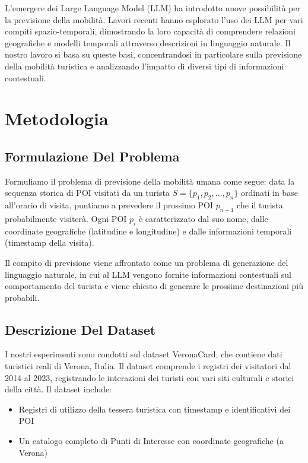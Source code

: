 \documentclass[12pt,a4paper]{article}
\begin{document}
L'emergere dei Large Language Model (LLM) ha introdotto nuove possibilità per la previsione della mobilità. Lavori recenti hanno esplorato l'uso dei LLM per vari compiti spazio-temporali, dimostrando la loro capacità di comprendere relazioni geografiche e modelli temporali attraverso descrizioni in linguaggio naturale. Il nostro lavoro si basa su queste basi, concentrandosi in particolare sulla previsione della mobilità turistica e analizzando l'impatto di diversi tipi di informazioni contestuali.

\newpage

\section{Metodologia}

\subsection{Formulazione Del Problema}

Formuliamo il problema di previsione della mobilità umana come segue: data la sequenza storica di POI visitati da un turista $S = \{p_1, p_2, ..., p_n\}$ ordinati in base all'orario di visita, puntiamo a prevedere il prossimo POI $p_{n+1}$ che il turista probabilmente visiterà. Ogni POI $p_i$ è caratterizzato dal suo nome, dalle coordinate geografiche (latitudine e longitudine) e dalle informazioni temporali (timestamp della visita).

Il compito di previsione viene affrontato come un problema di generazione del linguaggio naturale, in cui al LLM vengono fornite informazioni contestuali sul comportamento del turista e viene chiesto di generare le prossime destinazioni più probabili.


\subsection{Descrizione Del Dataset}

I nostri esperimenti sono condotti sul dataset VeronaCard, che contiene dati turistici reali di Verona, Italia. Il dataset comprende i registri dei visitatori dal 2014 al 2023, registrando le interazioni dei turisti con vari siti culturali e storici della città. Il dataset include:
\begin{itemize}
\item Registri di utilizzo della tessera turistica con timestamp e identificativi dei POI
\item Un catalogo completo di Punti di Interesse con coordinate geografiche (a Verona)
\end{itemize}
\end{document}
